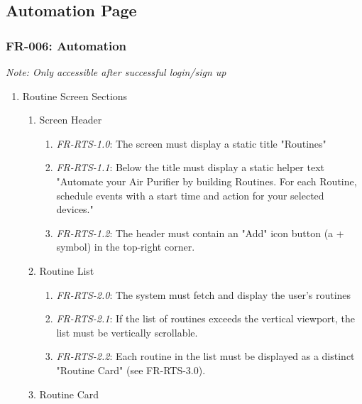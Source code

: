 \documentclass[conference]{IEEEtran}
\begin{document}
        \subsection{\textbf{Automation Page}}
            \subsubsection{FR-006: Automation}
                \textit{Note: Only accessible after successful login/sign up}
                    \begin{enumerate}
                        \item Routine Screen Sections
                            \begin{enumerate}
                                \item Screen Header
                                    \begin{enumerate}
                                        \item \textit{FR-RTS-1.0}: The screen must display a static title "Routines"
                                        \item \textit{FR-RTS-1.1}: Below the title must display a static helper text "Automate your Air Purifier by building Routines. For each Routine, schedule events with a start time and action for your selected devices."
                                        \item \textit{FR-RTS-1.2}: The header must contain an "Add" icon button (a + symbol) in the top-right corner.
                                    \end{enumerate}
                                \item Routine List
                                    \begin{enumerate}
                                        \item \textit{FR-RTS-2.0}: The system must fetch and display the user's routines
                                        \item \textit{FR-RTS-2.1}: If the list of routines exceeds the vertical viewport, the list must be vertically scrollable.
                                        \item \textit{FR-RTS-2.2}: Each routine in the list must be displayed as a distinct "Routine Card" (see FR-RTS-3.0).
                                    \end{enumerate}
                                \item Routine Card

\end{enumerate}
\end{enumerate}
\end{document}
